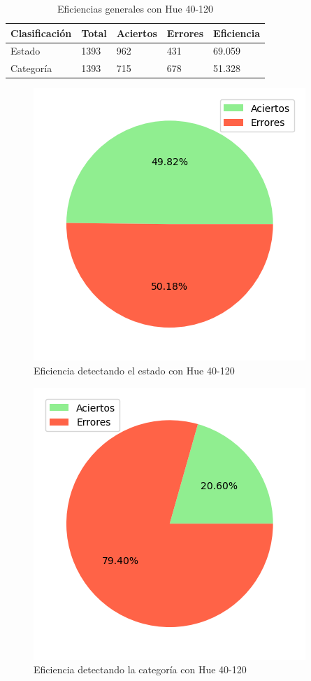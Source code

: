 \begin{table}[h!]
\centering
\begin{tabular}{|l|l|l|l|l|}
\hline 
\textbf{Clasificación} & \textbf{Total} & \textbf{Aciertos} & \textbf{Errores} & \textbf{Eficiencia} \\
\hline
Estado & 1393 & 962 & 431 & 69.059 \\
\hline 
Categoría & 1393 & 715 & 678 & 51.328 \\
\hline 
\end{tabular}
\caption{Eficiencias generales con Hue 40-120}
\label{table:efficiency_general_40_120}
\end{table}

\captionsetup[figure]{skip=-10pt}

\begin{figure}[H]
\centering
\includegraphics[scale=0.6]{images/result_global_state_40_120.png}
\caption{Eficiencia detectando el estado con Hue 40-120}
\label{img:efficiency_state_40_120}
\end{figure}

\begin{figure}[H]
\centering
\includegraphics[scale=0.6]{images/result_global_class_40_120.png}
\caption{Eficiencia detectando la categoría con Hue 40-120}
\label{img:efficiency_category_40_120}
\end{figure}

